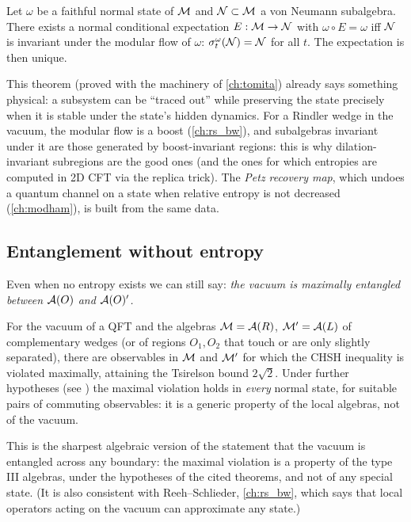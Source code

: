 \begin{theorem}[Takesaki]
Let $\omega$ be a faithful normal state of $\mathcal{M}$ and $\mathcal{N}\subset\mathcal{M}$ a von Neumann subalgebra. There exists a normal conditional expectation $E:\mathcal{M}\to\mathcal{N}$ with $\omega\circ E=\omega$ iff $\mathcal{N}$ is invariant under the modular flow of $\omega$: $\sigma^\omega_t(\mathcal{N})=\mathcal{N}$ for all $t$. The expectation is then unique.
\end{theorem}
This theorem (proved with the machinery of \cref{ch:tomita}) already says something physical: a subsystem can be ``traced out'' while preserving the state precisely when it is stable under the state's hidden dynamics. For a Rindler wedge in the vacuum, the modular flow is a boost (\cref{ch:rs_bw}), and subalgebras invariant under it are those generated by boost-invariant regions: this is why dilation-invariant subregions are the good ones (and the ones for which entropies are computed in 2D CFT via the replica trick). The \emph{Petz recovery map}, which undoes a quantum channel on a state when relative entropy is not decreased (\cref{ch:modham}), is built from the same data.

\subsection{Entanglement without entropy}

Even when no entropy exists we can still say: \emph{the vacuum is maximally entangled between $\mathcal{A}(O)$ and $\mathcal{A}(O)'$.}

\begin{theorem}
For the vacuum of a QFT and the algebras $\mathcal{M}=\mathcal{A}(R)$, $\mathcal{M}'=\mathcal{A}(L)$ of complementary wedges (or of regions $O_1,O_2$ that touch or are only slightly separated), there are observables in $\mathcal{M}$ and $\mathcal{M}'$ for which the CHSH inequality is violated maximally, attaining the Tsirelson bound $2\sqrt2$. Under further hypotheses (see \cite{SummersWerner1987}) the maximal violation holds in \emph{every} normal state, for suitable pairs of commuting observables: it is a generic property of the local algebras, not of the vacuum.
\end{theorem}
This is the sharpest algebraic version of the statement that the vacuum is entangled across any boundary: the maximal violation is a property of the type III algebras, under the hypotheses of the cited theorems, and not of any special state. (It is also consistent with Reeh--Schlieder, \cref{ch:rs_bw}, which says that local operators acting on the vacuum can approximate any state.)

